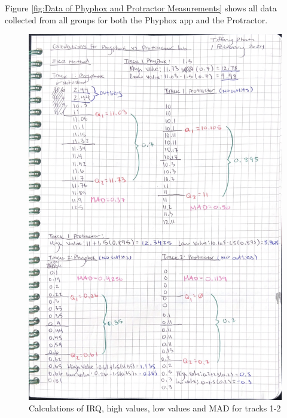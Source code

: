 \documentclass[idxtotoc,hyperref,openany]{labbook} %
\begin{document}
Figure \ref{fig:Data of Phyphox and Protractor Measurements} shows all data collected from all groups for both the Phyphox app and the Protractor.

\hfill \break
\vspace{3in}
\hfill \break
{}
\hfill \break
\begin{figure}[H] %
\begin{center}
\includegraphics[width=0.8\linewidth]{images/PhyProTrack1-2.png}
\end{center}
\caption{Calculations of IRQ, high values, low values and MAD for tracks 1-2}
\label{fig:Track1-2PhyphoxProtractor}
\end{figure}
\end{document}
